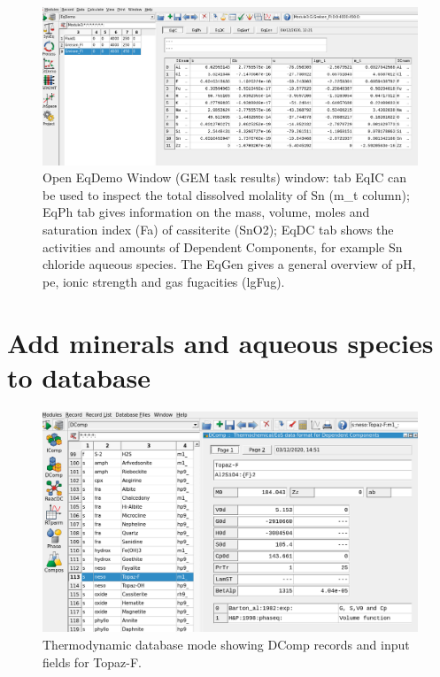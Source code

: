 \documentclass[
]{book}
\begin{document}
\begin{figure}
\includegraphics[width=1\linewidth]{figures/module3/fig-8} \caption{Open EqDemo Window (GEM task results) window: tab EqIC can be used to inspect the total dissolved molality of Sn (m\_t column); EqPh tab gives information on the mass, volume, moles and saturation index (Fa) of cassiterite (SnO2); EqDC tab shows the activities and amounts of Dependent Components, for example Sn chloride aqueous species. The EqGen gives a general overview of pH, pe, ionic strength and gas fugacities (lgFug).}\label{fig:fig-8c}
\end{figure}

\hypertarget{add-minerals-and-aqueous-species-to-database}{%
\section{Add minerals and aqueous species to database}\label{add-minerals-and-aqueous-species-to-database}}

\begin{figure}
\includegraphics[width=1\linewidth]{figures/module3/fig-9} \caption{Thermodynamic database mode showing DComp records and input fields for Topaz-F.}\label{fig:fig-9c}
\end{figure}
\end{document}
